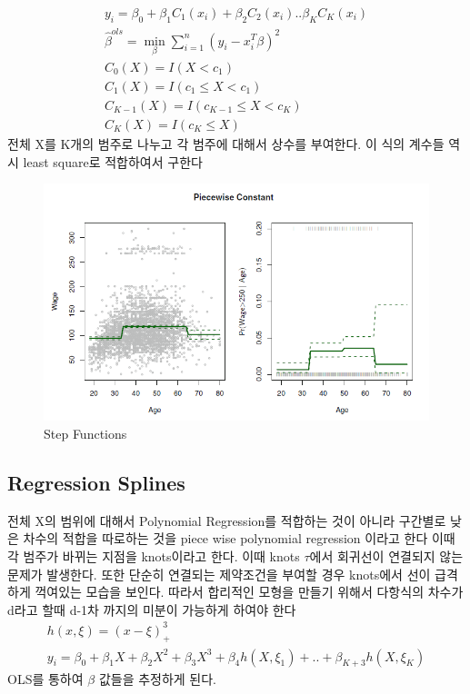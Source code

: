 \documentclass[11pt]{article}
\begin{document}
  \begin{align}
	y_{i} = \beta_{0} + \beta_{1}C_{1}(x_{i}) + \beta_{2}C_{2}(x_{i})  .. \beta_{K}C_{K}(x_{i})  \\
 	\hat{\beta}^{ols} = \min_{\beta} \sum\limits_{i=1}^n (y_{i} - x_{i}^T \beta)^2  \\
	C_{0}(X) = I(X<c_{1}) \\
	C_{1}(X) = I(c_{1} \leq X<c_{1}) \\
	C_{K-1}(X) = I(c_{K-1} \leq X<c_{K}) \\
	C_{K}(X) = I(c_{K} \leq X) 
  \end{align}
전체 X를 K개의 범주로 나누고 각 범주에 대해서 상수를 부여한다. 이 식의 계수들 역시 least square로 적합하여서 구한다
\begin{figure}[htbp]
\begin{center}
    \includegraphics[scale=1.2]{im2}
    \caption{Step Functions} \label{fig:label}
\end{center}
\end{figure}

\subsection{Regression Splines}
전체 X의 범위에 대해서 Polynomial Regression를 적합하는 것이 아니라 구간별로 낮은 차수의 적합을 따로하는 것을 piece wise polynomial regression 이라고 한다 이때 각 범주가 바뀌는 지점을 knots이라고 한다. 이때 knots $\tau$에서 회귀선이 연결되지 않는 문제가 발생한다. 또한 단순히 연결되는 제약조건을 부여할 경우 knots에서 선이 급격하게 꺽여있는 모습을 보인다. 따라서 합리적인 모형을 만들기 위해서 다항식의 차수가 d라고 할때 d-1차 까지의 미분이 가능하게 하여야 한다
  \begin{align}
h(x,\xi) = (x-\xi)^3_{+}\\
y_{i} = \beta_{0} + \beta_{1}X + \beta_{2}X^2 + \beta_{3}X^3   + \beta_{4}h(X,\xi_{1}) + .. + \beta_{K+3} h(X,\xi_{K})
  \end{align}
OLS를 통하여 $\beta$ 값들을 추정하게 된다.
\end{document}
